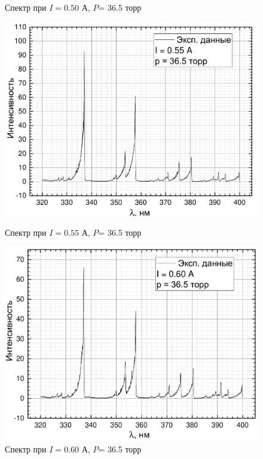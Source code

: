 \begin{figure}[H]
\begin{minipage}[H]{0.45\linewidth}
		\caption{Спектр при $I= 0.50 $ А, $P$= 36.5 торр}
		\label{full_50}
	\end{minipage}
	\begin{minipage}{0.45\linewidth}
		\centering
		\includegraphics[width=\linewidth]{data/graph_I=0,55}
		\caption{Спектр при $I= 0.55 $ А, $P$= 36.5 торр}
		\label{full_55}	
	\end{minipage} 
	\hfill
	\begin{minipage}[H]{0.45\linewidth}
		\centering
		\includegraphics[width=\linewidth]{data/graph_I=0,60}
		\caption{Спектр при $I= 0.60 $ А, $P$= 36.5 торр}
		\label{full_60}
	\end{minipage}
	\begin{minipage}{0.45\linewidth}

\end{minipage}
\end{figure}
